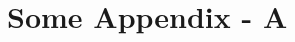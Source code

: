 \documentclass[../../main.tex]{subfiles}
\begin{document}
\section{Some Appendix - A}

\blindtext %
\newpage
\end{document}
